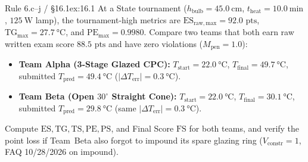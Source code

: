 \begin{workedexample}{Rule 6.c--j / §16.1}{ex:16.1}
At a State tournament ($h_{\mathrm{bulb}} = \SI{45.0}{\centi\meter}$, $t_{\mathrm{heat}} = \SI{10.0}{\minute}$, $\SI{125}{\watt}$ lamp), the tournament-high metrics are $\mathrm{ES}_{\mathrm{raw,max}} = 92.0\text{ pts}$, $\mathrm{TG}_{\max} = \SI{27.7}{\celsius}$, and $\mathrm{PE}_{\max} = 0.9980$. Compare two teams that both earn raw written exam score $88.5\text{ pts}$ and have zero violations ($M_{\mathrm{pen}} = 1.0$):
\begin{itemize}
  \item \textbf{Team Alpha (3-Stage Glazed CPC):} $T_{\mathrm{start}} = \SI{22.0}{\celsius}$, $T_{\mathrm{final}} = \SI{49.7}{\celsius}$, submitted $T_{\mathrm{pred}} = \SI{49.4}{\celsius}$ ($|\Delta T_{\mathrm{err}}| = \SI{0.3}{\celsius}$).
  \item \textbf{Team Beta (Open $30^\circ$ Straight Cone):} $T_{\mathrm{start}} = \SI{22.0}{\celsius}$, $T_{\mathrm{final}} = \SI{30.1}{\celsius}$, submitted $T_{\mathrm{pred}} = \SI{29.8}{\celsius}$ (same $|\Delta T_{\mathrm{err}}| = \SI{0.3}{\celsius}$).
\end{itemize}
Compute $\mathrm{ES}, \mathrm{TG}, \mathrm{TS}, \mathrm{PE}, \mathrm{PS}$, and Final Score $\mathrm{FS}$ for both teams, and verify the point loss if Team~Beta also forgot to impound its spare glazing ring ($V_{\mathrm{constr}} = 1$, FAQ 10/28/2026 on impound).


\end{workedexample}
